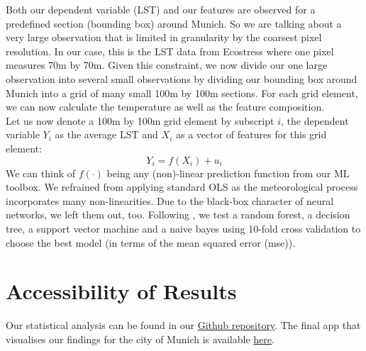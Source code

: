 \documentclass[12pt]{article}
\begin{document}
Both our dependent variable (LST) and our features are observed for a predefined section (bounding box) around Munich. So we are talking about a very large observation that is limited in granularity by the coarsest pixel resolution. In our case, this is the LST data from Ecostress where one pixel measures 70m by 70m. Given this constraint, we now divide our one large observation into several small observations by dividing our bounding box around Munich into a grid of many small 100m by 100m sections. For each grid element, we can now calculate the temperature as well as the feature composition. \\
Let us now denote a 100m by 100m grid element by subscript $i$, the dependent variable $Y_i$ as the average LST and $X_i$ as a vector of features for this grid element:
\begin{equation}
Y_i = f(X_i) + u_i
\end{equation}
We can think of $f(\cdot)$ being any (non)-linear prediction function from our ML toolbox. We refrained from applying standard OLS as the meteorological process incorporates many non-linearities. Due to the black-box character of neural networks, we left them out, too. Following \citet{seebacher2019}, we test a random forest, a decision tree, a support vector machine and a naive bayes using 10-fold cross validation to choose the best model (in terms of the mean squared error (\acrshort{mse})).


\section{Accessibility of Results}

Our statistical analysis can be found in our \href{https://github.com/MGenschow/DS_Project}{Github repository}. The final app that visualises our findings for the city of Munich is available \href{https://github.com/MGenschow/DS_Project}{here}.

\newpage
{}


\newpage
\printglossary[type=\acronymtype, nonumberlist, title={Abbreviations}]
\end{document}
